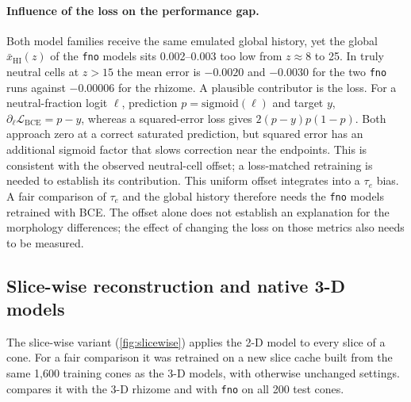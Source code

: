 \paragraph{Influence of the loss on the performance gap.} Both model families receive the same emulated global history, yet the global $\bar x_{\mathrm{HI}}(z)$ of the \texttt{fno} models sits 0.002--0.003 too low from $z\approx8$ to 25. In truly neutral cells at $z>15$ the mean error is $-0.0020$ and $-0.0030$ for the two \texttt{fno} runs against $-0.00006$ for the rhizome. A plausible contributor is the loss. For a neutral-fraction logit $\ell$, prediction $p=\mathrm{sigmoid}(\ell)$ and target $y$, $\partial_\ell\mathcal L_{\mathrm{BCE}}=p-y$, whereas a squared-error loss gives $2(p-y)p(1-p)$. Both approach zero at a correct saturated prediction, but squared error has an additional sigmoid factor that slows correction near the endpoints. This is consistent with the observed neutral-cell offset; a loss-matched retraining is needed to establish its contribution. This uniform offset integrates into a $\tau_e$ bias. A fair comparison of $\tau_e$ and the global history therefore needs the \texttt{fno} models retrained with BCE. The offset alone does not establish an explanation for the morphology differences; the effect of changing the loss on those metrics also needs to be measured.

\subsection{Slice-wise reconstruction and native 3-D models}
\label{sec:results-slicewise}

The slice-wise variant (\cref{fig:slicewise}) applies the 2-D model to every slice of a cone. For a fair comparison it was retrained on a new slice cache built from the same 1,600 training cones as the 3-D models, with otherwise unchanged settings.  compares it with the 3-D rhizome and with \texttt{fno} on all 200 test cones.

